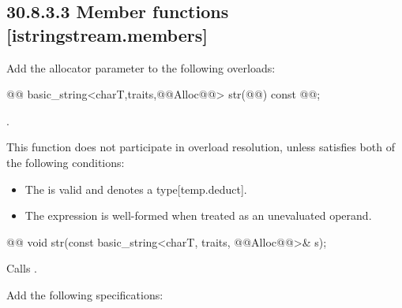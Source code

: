 \documentclass[ebook,11pt,article]{memoir}
\renewcommand{\iref}[1]{[#1]}
\begin{document}
\subsection{30.8.3.3 Member functions [istringstream.members]}
Add the allocator parameter to the following  overloads:
\begin{itemdecl}
@@
basic_string<charT,traits,@@Alloc@@> str(@@) const @\added{\&}@;
\end{itemdecl}
\begin{itemdescr}
\pnum
\returns
{}.

\begin{addedblock}
\pnum %
\constraints 
This function does not participate in overload resolution, unless  satisfies both of the following conditions: 

\begin{itemize}
\item The  
is valid and denotes a type\iref{temp.deduct}.

\item The expression 
is well-formed when treated as an unevaluated operand.
\end{itemize}
\end{addedblock}

\end{itemdescr}

\begin{itemdecl}
@@
void str(const basic_string<charT, traits, @@Alloc@@>& s);
\end{itemdecl}

\begin{itemdescr}
\pnum
\effects
Calls
.
\end{itemdescr}


Add the following specifications:
\end{document}
